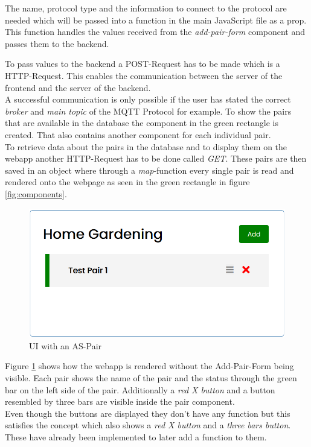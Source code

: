 The name, protocol type and the information to connect to the protocol are needed which will be passed into a function in the main JavaScript file as a prop. This function handles the values received from the \textit{add-pair-form} component and passes them to the backend. \newpage

To pass values to the backend a POST-Request has to be made which is a HTTP-Request. This enables the communication between the server of the frontend and the server of the backend. \\

A successful communication is only possible if the user has stated the correct \textit{broker} and \textit{main topic} of the MQTT Protocol for example. To show the pairs that are available in the database the component in the green rectangle is created. That also contains another component for each individual pair. \\ 

To retrieve data about the pairs in the database and to display them on the webapp another HTTP-Request has to be done called \textit{GET}. These pairs are then saved in an object where through a \textit{map}-function every single pair is read and rendered onto the webpage as seen in the green rectangle in figure \ref{fig:components}. \\

\begin{figure}[H]
    \centering
    \includegraphics[width=.65\textwidth]{images/4_3/Screenshot 2021-07-27 095812.png}
    \caption{UI with an AS-Pair}
    \label{fig:UI-AS-Pair}
\end{figure}

Figure \ref{fig:UI-AS-Pair} shows how the webapp is rendered without the Add-Pair-Form being visible. Each pair shows the name of the pair and the status through the green bar on the left side of the pair. Additionally a \textit{red X button} and a button resembled by three bars are visible inside the pair component. \\

Even though the buttons are displayed they don't have any function but this satisfies the concept which also shows a \textit{red X button} and a \textit{three bars button}. These have already been implemented to later add a function to them.








